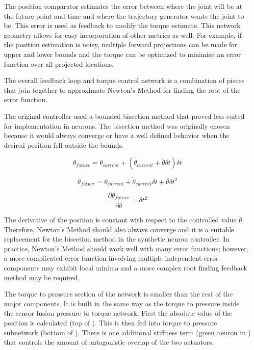 The position comparator estimates the error between where the joint will be at
the future point and time and where the trajectory generator wants the joint
to be. This error is used as feedback to modify the torque estimate.
This network geometry allows for easy incorporation of other metrics as well.
For example, if the position estimation is noisy, multiple forward projections
can be made for upper and lower bounds and the torque can be optimized to 
minimize an error function over all projected locations.


The overall feedback loop and torque control network is a combination of pieces
that join together to approximate
Newton's Method for finding the root of the error function.

The original 
controller used a bounded bisection method that proved less suited for 
implementation in neurons. The bisection method was originally chosen because
it would always converge or have a well defined behavior when the desired
position fell outside the bounds.

\begin{equation}
\theta_{future} = \theta_{current} + (\dot{\theta}_{current} + \ddot{\theta} \delta t) \delta t
\end{equation}

\begin{equation}
\theta_{future} = \theta_{current} + \dot{\theta}_{current} \delta t + \ddot{\theta} \delta t^{2}
\end{equation}

\begin{equation}
\dfrac{\partial \theta_{future}}{\partial \ddot{\theta}} = \delta t^{2}
\end{equation}

The derivative of the position is constant with respect to the controlled value
$\ddot{\theta}$. Therefore, Newton's Method should also always converge and it is a suitable replacement for the bisection method in the synthetic neuron
controller. In practice, Newton's Method should work well with many error functions; however,
a more complicated error function involving multiple independent error 
components may exhibit local minima and a more complex root finding feedback
method may be required.


The torque to pressure section of the network is smaller than the rest of the 
major components. It is built in the same way as the torque to pressure inside
the sensor fusion pressure to torque network. First the absolute value of the position is calculated (top of ). This is then fed into torque to pressure subnetwork (bottom of ). There is one additional stiffness term (green neuron in ) that controls the amount of antagonistic overlap of the two actuators.

